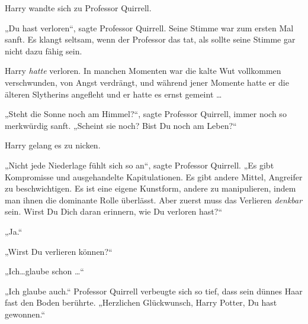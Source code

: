Harry wandte sich zu Professor Quirrell.

„Du hast verloren“, sagte Professor Quirrell. Seine Stimme war zum ersten Mal sanft. Es klangt seltsam, wenn der Professor das tat, als sollte seine Stimme gar nicht dazu fähig sein.

Harry \emph{hatte} verloren. In manchen Momenten war die kalte Wut vollkommen verschwunden, von Angst verdrängt, und während jener Momente hatte er die älteren Slytherins angefleht und er hatte es ernst gemeint …

„Steht die Sonne noch am Himmel?“, sagte Professor Quirrell, immer noch so merkwürdig sanft. „Scheint sie noch? Bist Du noch am Leben?“

Harry gelang es zu nicken.

„Nicht jede Niederlage fühlt sich so an“, sagte Professor Quirrell. „Es gibt Kompromisse und ausgehandelte Kapitulationen. Es gibt andere Mittel, Angreifer zu beschwichtigen. Es ist eine eigene Kunstform, andere zu manipulieren, indem man ihnen die dominante Rolle überlässt. Aber zuerst muss das Verlieren \emph{denkbar} sein. Wirst Du Dich daran erinnern, wie Du verloren hast?“

„Ja.“

„Wirst Du verlieren können?“

„Ich…glaube schon …“

„Ich glaube auch.“ Professor Quirrell verbeugte sich so tief, dass sein dünnes Haar fast den Boden berührte. „Herzlichen Glückwunsch, Harry Potter, Du hast gewonnen.“

